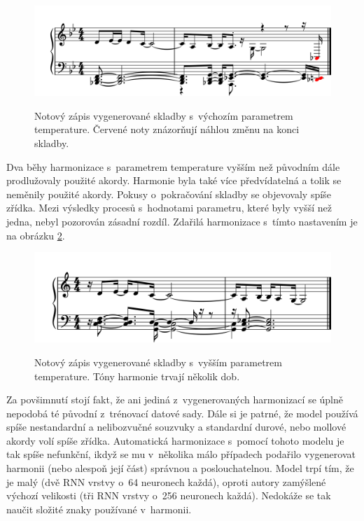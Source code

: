 \begin{figure}[h]\centering
    \centering
    \includegraphics[width=0.8\linewidth]{obrazky/KratkaSkladbaHarmonizovanaDefNoty-1.png}\\[1pt]  
    \caption{Notový zápis vygenerované skladby s~výchozím parametrem temperature. 
    Červené noty znázorňují náhlou změnu na konci skladby.}    
    \label{obrazekKratkaSkladbaHarmonizovanaDefNoty}
\end{figure}
\par

Dva běhy harmonizace s~parametrem temperature vyšším než původním
dále prodlužovaly použité akordy.
Harmonie byla také více předvídatelná a tolik se neměnily použité akordy.
Pokusy o~pokračování skladby se objevovaly spíše zřídka.
Mezi výsledky procesů s~hodnotami parametru, 
které byly vyšší než jedna, nebyl pozorován zásadní rozdíl.
Zdařilá harmonizace s~tímto nastavením je na obrázku 
\ref{obrazekKratkaSkladbaHarmonizovanaHighNoty}.

\begin{figure}[h]\centering
    \centering
    \includegraphics[width=0.8\linewidth]{obrazky/KratkaSkladbaHarmonizovanaHighNoty-1.png}\\[1pt]  
    \caption{Notový zápis vygenerované skladby s~vyšším parametrem temperature. 
    Tóny harmonie trvají několik dob.}    
    \label{obrazekKratkaSkladbaHarmonizovanaHighNoty}
\end{figure}
\par

Za povšimnutí stojí fakt, 
že ani jediná z~vygenerovaných harmonizací se úplně nepodobá té původní
z~trénovací datové sady.
Dále si je patrné, že model používá spíše nestandardní a nelibozvučné souzvuky
a standardní durové, nebo mollové akordy volí spíše zřídka.
Automatická harmonizace s~pomocí tohoto modelu je tak spíše nefunkční,
ikdyž se mu v~několika málo případech podařilo vygenerovat harmonii 
(nebo alespoň její část) správnou a poslouchatelnou.
Model trpí tím, že je malý (dvě RNN vrstvy o~64 neuronech každá),
oproti autory zamýšlené výchozí velikosti (tři RNN vrstvy o~256 neuronech každá).
Nedokáže se tak naučit složité znaky používané v~harmonii.

